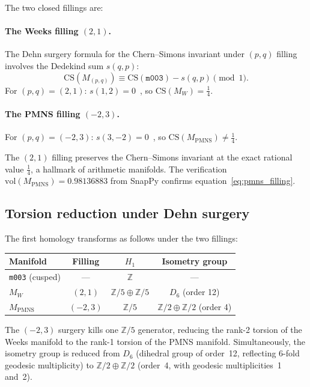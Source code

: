 \documentclass[12pt]{article}
\theoremstyle{definition}
\begin{document}
The two closed fillings are:

\paragraph{The Weeks filling $(2,1)$.}
The Dehn surgery formula for the Chern--Simons invariant under
$(p,q)$ filling involves the Dedekind sum $s(q,p)$:
\[
  \mathrm{CS}(M_{(p,q)}) \equiv \mathrm{CS}(\texttt{m003})
  - s(q,p) \pmod{1}.
\]
For $(p,q) = (2,1)$: $s(1,2) = 0$~\cite{KirkKlassen}, so
$\mathrm{CS}(M_W) = \tfrac{1}{4}$.

\paragraph{The PMNS filling $(-2,3)$.}
For $(p,q) = (-2,3)$: $s(3,-2) = 0$~\cite{KirkKlassen}, so
$\mathrm{CS}(M_\mathrm{PMNS}) \neq \tfrac{1}{4}$.

The $(2,1)$ filling preserves the Chern--Simons invariant at the exact
rational value $\tfrac{1}{4}$, a hallmark of arithmetic manifolds.
The verification $\mathrm{vol}(M_\mathrm{PMNS}) = 0.98136883$ from
SnapPy confirms equation~\eqref{eq:pmns_filling}.

\subsection{Torsion reduction under Dehn surgery}

The first homology transforms as follows under the two fillings:

\begin{center}
\begin{tabular}{lccc}
\toprule
Manifold & Filling & $H_1$ & Isometry group \\
\midrule
\texttt{m003} (cusped) & --- & $\mathbb{Z}$ & --- \\
$M_W$ & $(2,1)$ & $\mathbb{Z}/5\oplus\mathbb{Z}/5$ & $D_6$ (order 12)\\
$M_\mathrm{PMNS}$ & $(-2,3)$ & $\mathbb{Z}/5$ & $\mathbb{Z}/2\oplus
\mathbb{Z}/2$ (order 4)\\
\bottomrule
\end{tabular}
\end{center}

The $(-2,3)$ surgery kills one $\mathbb{Z}/5$ generator, reducing the
rank-2 torsion of the Weeks manifold to the rank-1 torsion of the PMNS
manifold. Simultaneously, the isometry group is reduced from $D_6$
(dihedral group of order~12, reflecting $6$-fold geodesic multiplicity)
to $\mathbb{Z}/2\oplus\mathbb{Z}/2$ (order~4, with geodesic
multiplicities~1 and~2).
\end{document}
